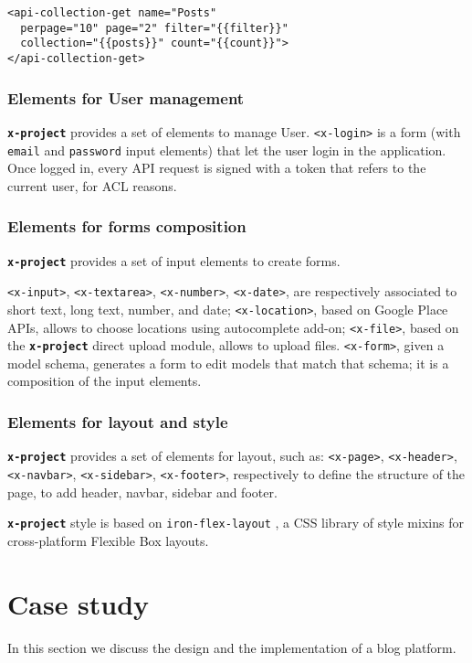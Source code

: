 \documentclass{sig-alternate}
\newcommand{\brand}[1]{\textbf{\tt #1}}
\begin{document}
\begin{lstlisting}[language=HTML5]
<api-collection-get name="Posts" 
  perpage="10" page="2" filter="{{filter}}"
  collection="{{posts}}" count="{{count}}">
</api-collection-get>
\end{lstlisting}


\subsubsection{Elements for User management}
\brand{x-project} provides a set of elements to manage User.
\texttt{<x-login>} is a form (with \texttt{email} and \texttt{password} input elements) that let the user login in the application. Once logged in, every API request is signed with a token that refers to the current user, for ACL reasons.


\subsubsection{Elements for forms composition}
\brand{x-project} provides a set of input elements to create forms. 

\texttt{<x-input>}, \texttt{<x-textarea>}, \texttt{<x-number>}, \texttt{<x-date>}, are respectively associated to short text, long text, number, and date; \texttt{<x-location>}, based on Google Place APIs, allows to choose locations using autocomplete add-on; \texttt{<x-file>}, based on the \brand{x-project} direct upload module, allows to upload files.
\texttt{<x-form>}, given a model schema, generates a form to edit models that match that schema; it is a composition of the input elements.

\subsubsection{Elements for layout and style}
\brand{x-project} provides a set of elements for layout, such as: \texttt{<x-page>}, \texttt{<x-header>}, \texttt{<x-navbar>}, \texttt{<x-sidebar>}, \texttt{<x-footer>}, respectively to define the structure of the page, to add header, navbar, sidebar and footer.

\brand{x-project} style is based on \texttt{iron-flex-layout} \cite{iron-elements}, a CSS library of style mixins for cross-platform Flexible Box \cite{css-flexbox} layouts.

\section{Case study}
In this section we discuss the design and the implementation of a blog platform. 
\end{document}

